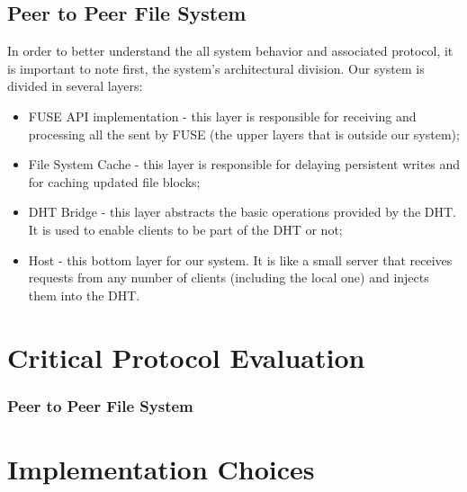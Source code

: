 \documentclass[times,9pt,article]{llncs}
\begin{document}
\subsection{Peer to Peer File System}
In order to better understand the all system behavior and associated protocol, it is important  to note first, the system's architectural division. Our system is divided in several layers:

\begin{itemize}
\item FUSE API implementation - this layer is responsible for receiving and processing all the sent by FUSE (the upper layers that is outside our system);
\item File System Cache - this layer is responsible for delaying persistent writes and for caching updated file blocks;
\item DHT Bridge - this layer abstracts the basic operations provided by the DHT. It is used to enable clients to be part of the DHT or not;
\item Host - this bottom layer for our system. It is like a small server that receives requests from any number of clients (including the local one) and injects them into the DHT.
\end{itemize}



\section{Critical Protocol Evaluation}

\subsubsection{Peer to Peer File System}

\section{Implementation Choices}
\end{document}
